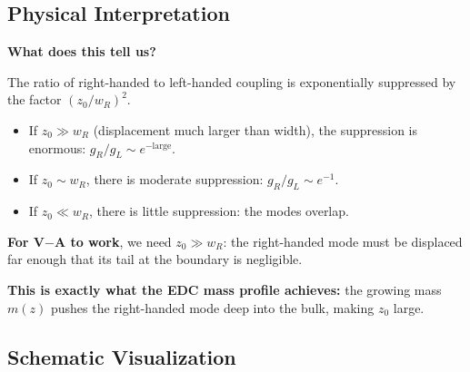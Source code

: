 \subsection{Physical Interpretation}

\textbf{What does this tell us?}

The ratio of right-handed to left-handed coupling is exponentially suppressed
by the factor $(z_0/w_R)^2$.

\begin{itemize}[nosep]
    \item If $z_0 \gg w_R$ (displacement much larger than width), the suppression
          is enormous: $g_R/g_L \sim e^{-\text{large}}$.
    \item If $z_0 \sim w_R$, there is moderate suppression: $g_R/g_L \sim e^{-1}$.
    \item If $z_0 \ll w_R$, there is little suppression: the modes overlap.
\end{itemize}

\textbf{For V$-$A to work}, we need $z_0 \gg w_R$: the right-handed mode must
be displaced far enough that its tail at the boundary is negligible.

\textbf{This is exactly what the EDC mass profile achieves:} the growing mass
$m(z)$ pushes the right-handed mode deep into the bulk, making $z_0$ large.


\subsection{Schematic Visualization}

